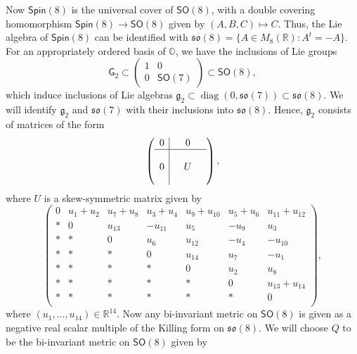 \documentclass{amsart}
\numberwithin{equation}{section}
\theoremstyle{plain}
\theoremstyle{definition}
\theoremstyle{remark}
\numberwithin{table}{section}
\DeclareMathOperator{\diag}{diag}
\newcommand{\gG}{\mathsf{G}}
\newcommand{\SO}{\mathsf{SO}}
\newcommand{\Spin}{\mathsf{Spin}}
\newcommand{\fg}{\mathfrak{g}}
\newcommand{\so}{\mathfrak{so}}
\newcommand{\bO}{\mathbb{O}}
\newcommand{\bR}{\mathbb{R}}
\begin{document}
    Now $\Spin(8)$ is the universal cover of $\SO(8)$, with a double covering homomorphism $\Spin(8)\to\SO(8)$ given by $(A,B,C) \mapsto C$.
    Thus, the Lie algebra of $\Spin(8)$ can be identified with $\so(8) = \{A \in M_8(\bR) : A^t = -A\}$.
    For an appropriately ordered basis of $\bO$, we have the inclusions of Lie groups
    \[
        \gG_2 \subset 
        \begin{pmatrix}
            1 & 0 \\
            0 & \SO(7)
        \end{pmatrix}
        \subset \SO(8),
    \]
    which induce inclusions of Lie algebras $\fg_2 \subset \diag(0,\so(7)) \subset \so(8)$.
    We will identify $\fg_2$ and $\so(7)$ with their inclusions into $\so(8)$.
    Hence, $\fg_2$ consists of matrices of the form
    \[
        \left( 
            \begin{array}{c|ccc}
              0 &  & 0 &  \\ \hline
               &  &  &  \\
              0 &  & U &  \\
               &  &  &  
            \end{array} 
        \right),
    \]
    where $U$ is a skew-symmetric matrix given by
    \[
        \begin{pmatrix}
            0                & u_1+u_2 & u_7+u_8 & u_3+u_4 & u_9+u_{10} & u_5+u_6           & u_{11}+u_{12} \\
            *       & 0       & u_{13}  & -u_{11} & u_5        & -u_9              & u_3           \\
            *      & * & 0       & u_6     & u_{12}     & -u_4              & -u_{10}       \\
            *      & *  & *    & 0       & u_{14}     & u_7               & -u_1          \\
            *    & *    & * & * & 0          & u_2               & u_8           \\
            *      & *    & *    & *    & *       & 0                 & u_{13}+u_{14} \\
            * & *    & *  & *     & *       & *  & 0             \\
        \end{pmatrix},
    \]
    where $(u_1, \dots , u_{14}) \in \bR^{14}$.
    Now any bi-invariant metric on $\SO(8)$ is given as a negative real scalar multiple of the Killing form on $\so(8)$.
    We will choose $Q$ to be the bi-invariant metric on $\SO(8)$ given by
\end{document}
